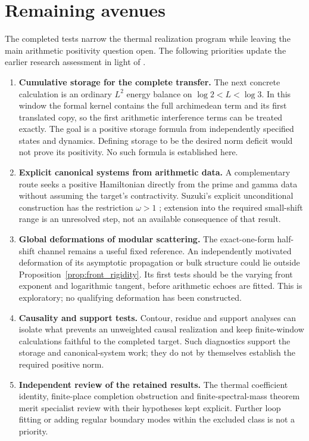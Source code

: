 \section{Remaining avenues}
\label{sec:outlook}

The completed tests narrow the thermal realization program while
leaving the main arithmetic positivity question open. The following
priorities update the earlier research assessment \cite{AvenuesNote}
in light of \cite{InterfaceNote,BoundaryNote}.

\begin{enumerate}
\item \textbf{Cumulative storage for the complete transfer.}
The next concrete calculation is an ordinary $L^2$ energy balance on
$\log2<L<\log3$. In this window the formal kernel contains the full
archimedean term and its first translated copy, so the first arithmetic
interference terms can be treated exactly. The goal is a positive
storage formula from independently specified states and dynamics.
Defining storage to be the desired norm deficit would not prove its
positivity. No such formula is established here.

\item \textbf{Explicit canonical systems from arithmetic data.}
A complementary route seeks a positive Hamiltonian directly from the
prime and gamma data without assuming the target's contractivity.
Suzuki's explicit unconditional construction has the restriction
$\omega>1$ \cite{Suzuki}; extension into the required small-shift
range is an unresolved step, not an available consequence of that
result.

\item \textbf{Global deformations of modular scattering.}
The exact-one-form half-shift channel remains a useful fixed reference.
An independently motivated deformation of its asymptotic propagation
or bulk structure could lie outside Proposition~\ref{prop:front_rigidity}.
Its first tests should be the varying front exponent and logarithmic
tangent, before arithmetic echoes are fitted. This is exploratory;
no qualifying deformation has been constructed.

\item \textbf{Causality and support tests.}
Contour, residue and support analyses can isolate what prevents an
unweighted causal realization and keep finite-window calculations
faithful to the completed target. Such diagnostics support the storage
and canonical-system work; they do not by themselves establish the
required positive norm.

\item \textbf{Independent review of the retained results.}
The thermal coefficient identity, finite-place completion obstruction
and finite-spectral-mass theorem merit specialist review with their
hypotheses kept explicit. Further loop fitting or adding regular
boundary modes within the excluded class is not a priority.
\end{enumerate}
